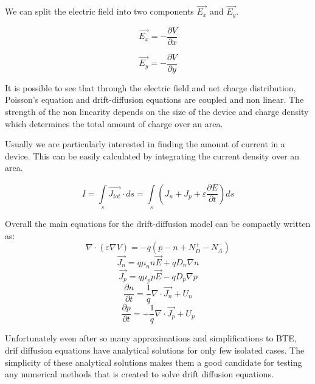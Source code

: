 We can split the electric field into two components $\vec{E_x}$ and $\vec{E_y}$.

\begin{equation}
\vec{E_x}=-\frac{\partial V}{\partial x}
\end{equation}

\begin{equation}
\vec{E_y}=-\frac{\partial V}{\partial y}
\end{equation}

It is possible to see that through the electric field and net charge distribution, Poisson's equation and drift-diffusion equations are coupled and non linear. The strength of the non linearity depends on the size of the device and charge density which determines the total amount of charge over an area.  

Usually we are particularly interested in finding the amount of current in a device. This can be easily calculated by integrating the current density over an area.

\begin{equation}
I=\int\limits_{s}^{}\vec{J_{tot}} \cdot ds = \int\limits_{s}^{}(J_n+J_p+\varepsilon\frac{\partial E}{\partial t})ds
\end{equation}

Overall the main equations for the drift-diffusion model can be compactly written as:
\begin{equation}
\nabla \cdot  (\varepsilon \nabla V)=-q(p-n+N_{D}^{+}-N_{A}^{-})
\end{equation}
\begin{equation}
\vec{J_n}=q\mu_n n \vec{E}+q D_n \nabla n
\end{equation}
\begin{equation}
\vec{J_p}=q\mu_p p \vec{E}-q D_p \nabla p
\end{equation}
\begin{equation}
\frac{\partial n}{\partial t}=\frac{1}{q}\nabla \cdot \vec{J_n}+U_{n}
\end{equation}
\begin{equation}
\frac{\partial p}{\partial t}=-\frac{1}{q}\nabla \cdot \vec{J_p}+U_{p}
\end{equation}

Unfortunately even after so many approximations and simplifications to BTE, drif diffusion equations have analytical solutions for only few isolated cases. The simplicity of these analytical solutions makes them a good candidate for testing any numerical methods that is created to solve drift diffusion equations. 

